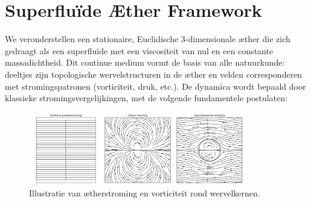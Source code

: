 \section{Superfluïde Æther Framework}

We veronderstellen een stationaire, Euclidische 3-dimensionale æther die zich gedraagt als een superfluïde met een viscositeit van nul en een constante massadichtheid. Dit continue medium vormt de basis van alle natuurkunde: deeltjes zijn topologische wervelstructuren in de æther en velden corresponderen met stromingspatronen (vorticiteit, druk, etc.). De dynamica wordt bepaald door klassieke stromingsvergelijkingen, met de volgende fundamentele postulaten:

\begin{figure}[htbp]
    \centering
    \includegraphics[width=0.85\textwidth]{images/03-combined_flow_nl}
    \caption{Illustratie van ætherstroming en vorticiteit rond wervelkernen.}
    \label{fig:vortexfields}
\end{figure}

